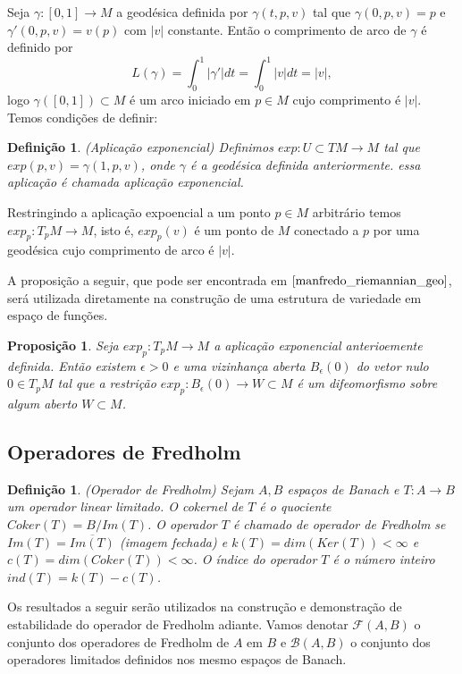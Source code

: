 \documentclass[12pt]{book}
\newtheorem{definicao}[teorema]{Definição}
\newtheorem{proposicao}[teorema]{Proposição}
\newcommand{\operadoresfredholm}[2]{\mathcal{F}(#1, #2)}
\newcommand{\operadoreslimitados}[2]{\mathcal{B}(#1, #2)}
\begin{document}
	Seja $\gamma:[0,1] \to M$ a geodésica definida por $\gamma(t,p,v)$ tal que $\gamma(0,p,v) = p$ e $\gamma'(0,p,v) = v(p)$ com $|v|$ constante. Então o comprimento de arco de $\gamma$ é definido por 
	$$
	L(\gamma) =  \int_{0}^{1}|\gamma'|dt = \int_{0}^{1}|v|dt = |v|,
	$$
	logo $\gamma([0,1]) \subset M$ é um arco iniciado em $p \in M$ cujo comprimento é $|v|$. Temos condições de definir:
	\begin{definicao}\label{definicao_aplicacao_exponencial}
		(Aplicação exponencial) Definimos $exp:U \subset TM \to M$ tal que $exp(p,v) = \gamma(1, p, v)$, onde $\gamma$ é a geodésica definida anteriormente. essa aplicação é chamada aplicação exponencial.
	\end{definicao}
	
	Restringindo a aplicação expoencial a um ponto $p \in M$ arbitrário temos $exp_{p}:T_{p}M \to M$, isto é, $exp_{p}(v)$ é um ponto de $M$ conectado a $p$ por uma geodésica cujo comprimento de arco é $|v|$. 
	
	A proposição a seguir, que pode ser encontrada em $\cite{manfredo_riemannian_geo}$, será utilizada diretamente na construção de uma estrutura de variedade em espaço de funções.
	
	\begin{proposicao}\label{p}
		Seja  $exp_{p}:T_{p}M \to M$ a aplicação exponencial anterioemente definida. Então existem $\epsilon>0$ e uma vizinhança aberta $B_{\epsilon}(0)$ do vetor nulo $0 \in T_{p}M$ tal que a restrição $exp_{p}:B_{\epsilon}(0) \to W \subset M$ é um difeomorfismo sobre algum aberto $W \subset M$.
	\end{proposicao}
	
	\subsection{Operadores de Fredholm}
	\begin{definicao}\label{definicao_oeprador_fredholm}
		(Operador de Fredholm) Sejam $A, B$ espaços de Banach e $T: A\to B$ um operador linear limitado. O cokernel de $T$ é o quociente $Coker(T)=B/Im(T)$. O operador $T$ é chamado de operador de Fredholm se $Im(T)=\overline{Im(T)}$ (imagem fechada) e $k(T) = dim(Ker(T)) < \infty$ e $c(T)=dim(Coker(T)) < \infty$. O índice do operador $T$ é o número inteiro $ind(T) = k(T) - c(T)$.  
	\end{definicao}
	
	Os resultados a seguir serão utilizados na construção e demonstração de estabilidade do operador de Fredholm adiante. Vamos denotar $\operadoresfredholm{A}{B}$ o conjunto dos operadores de Fredholm de $A$ em $B$ e $\operadoreslimitados{A}{B}$ o conjunto dos operadores limitados definidos nos mesmo espaços de Banach.
\end{document}
